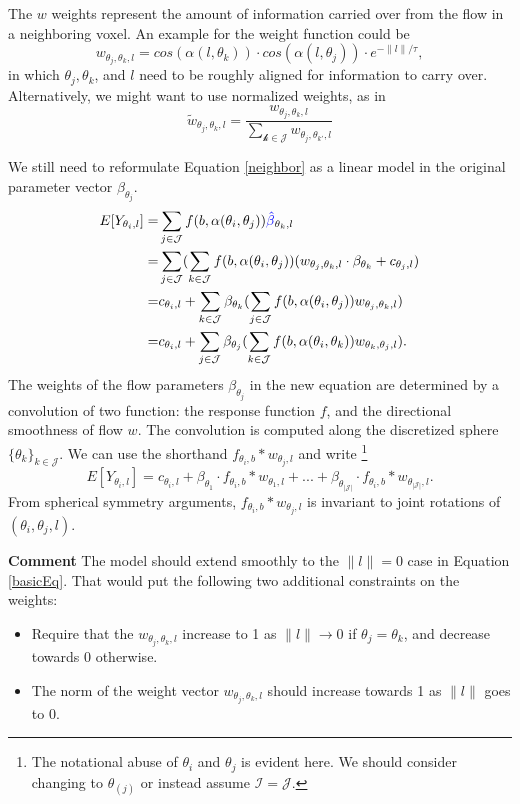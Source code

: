 \documentclass[11pt]{amsart}
\newcommand{\tj}{\theta_j}
\newcommand{\ti}{\theta_i}
\newcommand{\tk}{\theta_k}
\newcommand{\ytil}{Y_{\theta_i,l}}
\begin{document}
The $w$ weights represent the amount of information carried over from the flow in a neighboring voxel. 
An example for the weight function could be
\[ w_{\tj,\tk, l}  = cos(\alpha(l,\tk)) \cdot cos(\alpha(l, \tj)) \cdot e^{-\|l\|/\tau}, \]
in which $\tj, \tk$, and $l$ need to be roughly aligned for information to carry over. 
Alternatively, we might want to use normalized weights, as in 
\[\tilde{w}_{\tj,\tk, l}  = \frac{w_{\tj,\tk, l}}{\sum_\mathcal{k \in \mathcal{J}} w_{\tj,\theta_{k'}, l}} \]

We still need to reformulate Equation \eqref{neighbor} as a linear model in the original parameter vector $\beta_{\tj}$.
\begin{eqnarray*}
E[\ytil] = & \sum_{j \in \mathcal{J}}  f(b, \alpha(\ti, \tj)) \textcolor{blue}{\hat{\beta}}_{\tk,l} \\
 = & \sum_{j \in \mathcal{J}} ( \sum_{k\in\mathcal{J}} f(b, \alpha(\ti, \tj)) ( w_{\tj,\tk, l} \cdot \beta_{\tk} + c_{\tj,l})\\
 = & c_{\ti,l} +  \sum_{k\in\mathcal{J}}  \beta_{\tk}  (\sum_{j \in \mathcal{J}}  f(b, \alpha(\ti, \tj))  w_{\tj,\tk, l})\\
  = & c_{\ti,l} +  \sum_{j\in\mathcal{J}}  \beta_{\tj}  (\sum_{k\in \mathcal{J}}  f(b, \alpha(\ti, \tk))  w_{\tk,\tj, l}).
\end{eqnarray*}   
The weights of the flow parameters $\beta_{\tj}$ in the new equation are determined by a convolution of two function: 
the response function $f$, and the directional smoothness of flow $w$. 
The convolution is computed along the discretized sphere $\{\tk\}_{k \in \mathcal{J}}$. 
We can use the shorthand $f_{\ti,b}* w_{\tj,l}$ and write
\footnote{The notational abuse of $\ti$ and $\tj$ is evident here. We should consider changing to $\theta_{(j)}$ or instead assume $\mathcal{I}=\mathcal{J}$.} 
\begin{equation}
E[\ytil]  = c_{\ti,l} +  \beta_{\theta_1} \cdot f_{\ti,b}* w_{\theta_1,l}+ ... +\beta_{\theta_{|\mathcal{J}|}} \cdot f_{\ti,b}* w_{\theta_{|\mathcal{J}|},l}.
\end{equation}
From spherical symmetry arguments, $f_{\ti,b}*w_{\tj,l}$ is invariant to joint rotations of $(\ti,\tj, l)$.

\textbf{Comment} The model should extend smoothly to the $\| l\| = 0$ case in Equation \eqref{basicEq}. 
That would put the following two additional constraints on the weights: 
\begin{itemize}
\item Require that the $w_{\tj,\tk,l}$ increase to 1 as $\|l\| \to 0$ if $\tj=\tk$, and decrease towards 0 otherwise.
\item The norm of the weight vector $w_{\tj,\tk,l}$ should increase towards 1 as $\|l\|$ goes to 0. 
\end{itemize}
\end{document}
